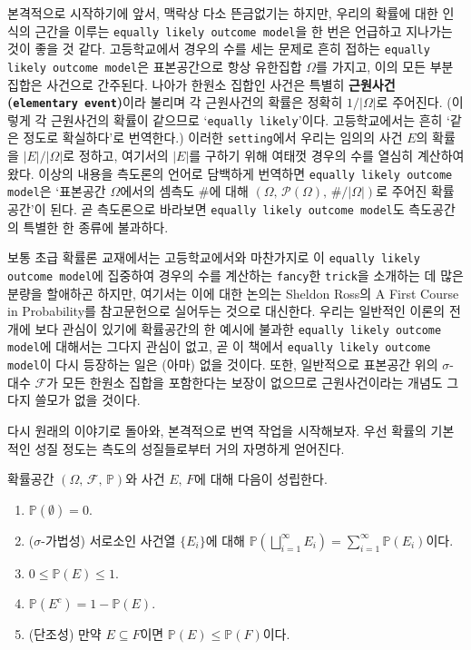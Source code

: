 본격적으로 시작하기에 앞서, 맥락상 다소 뜬금없기는 하지만, 우리의 확률에 대한 인식의 근간을 이루는 \texttt{equally likely outcome model}을 한 번은 언급하고 지나가는 것이 좋을 것 같다. 고등학교에서 경우의 수를 세는 문제로 흔히 접하는 \texttt{equally likely outcome model}은 표본공간으로 항상 유한집합 $\Omega$를 가지고, 이의 모든 부분집합은 사건으로 간주된다. 나아가 한원소 집합인 사건은 특별히 \textbf{근원사건(\texttt{elementary event})}이라 불리며 각 근원사건의 확률은 정확히 $1/|\Omega|$로 주어진다. (이렇게 각 근원사건의 확률이 같으므로 `\texttt{equally likely}'이다. 고등학교에서는 흔히 `같은 정도로 확실하다'로 번역한다.) 이러한 \texttt{setting}에서 우리는 임의의 사건 $E$의 확률을 $|E|/|\Omega|$로 정하고, 여기서의 $|E|$를 구하기 위해 여태껏 경우의 수를 열심히 계산하여 왔다. 이상의 내용을 측도론의 언어로 담백하게 번역하면 \texttt{equally likely outcome model}은 `표본공간 $\Omega$에서의 셈측도 $\#$에 대해 $(\Omega,\,\mathcal{P}(\Omega),\,\#/|\Omega|)$로 주어진 확률공간'이 된다. 곧 측도론으로 바라보면 \texttt{equally likely outcome model}도 측도공간의 특별한 한 종류에 불과하다.

보통 초급 확률론 교재에서는 고등학교에서와 마찬가지로 이 \texttt{equally likely outcome model}에 집중하여 경우의 수를 계산하는 \texttt{fancy}한 \texttt{trick}을 소개하는 데 많은 분량을 할애하곤 하지만, 여기서는 이에 대한 논의는 Sheldon Ross의 A First Course in Probability를 참고문헌으로 실어두는 것으로 대신한다. 우리는 일반적인 이론의 전개에 보다 관심이 있기에 확률공간의 한 예시에 불과한 \texttt{equally likely outcome model}에 대해서는 그다지 관심이 없고, 곧 이 책에서 \texttt{equally likely outcome model}이 다시 등장하는 일은 (아마) 없을 것이다. 또한, 일반적으로 표본공간 위의 $\sigma$-대수 $\mathcal{F}$가 모든 한원소 집합을 포함한다는 보장이 없으므로 근원사건이라는 개념도 그다지 쓸모가 없을 것이다.

다시 원래의 이야기로 돌아와, 본격적으로 번역 작업을 시작해보자. 우선 확률의 기본적인 성질 정도는 측도의 성질들로부터 거의 자명하게 얻어진다.

\begin{theorem}
    확률공간 $(\Omega,\,\mathcal{F},\,\mathbb{P})$와 사건 $E,\,F$에 대해 다음이 성립한다.
    \begin{enumerate}
        \item $\mathbb{P}(\emptyset)=0$.
        \item ($\sigma$-가법성) 서로소인 사건열 $\{E_i\}$에 대해 $\mathbb{P}(\bigsqcup_{i=1}^\infty E_i)=\sum_{i=1}^\infty\mathbb{P}(E_i)$이다.
        \item $0\leq\mathbb{P}(E)\leq1$.
        \item $\mathbb{P}(E^c)=1-\mathbb{P}(E)$.
        \item (단조성) 만약 $E\subseteq F$이면 $\mathbb{P}(E)\leq\mathbb{P}(F)$이다.
    \end{enumerate}
\end{theorem}

